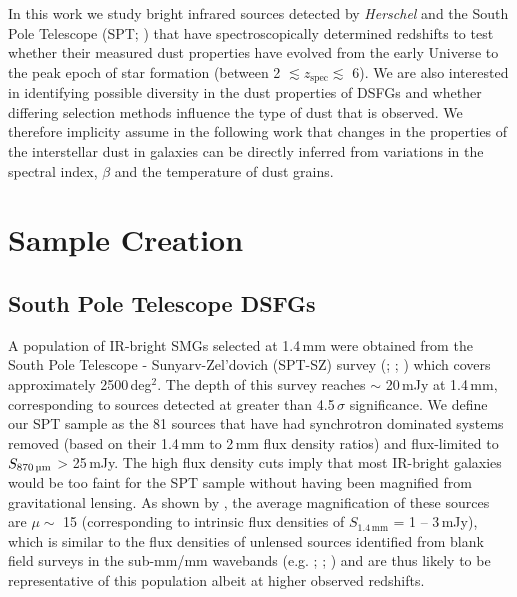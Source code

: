 In this work we study bright infrared sources detected by \textit{Herschel} and the South Pole Telescope (SPT; \citealt{Carlstrom_2011}) that have spectroscopically determined redshifts to test whether their measured dust properties have evolved from the early Universe to the peak epoch of star formation (between 2 $\lesssim z_{\textrm{spec}} \lesssim$ 6). We are also interested in identifying possible diversity in the dust properties of DSFGs and whether differing selection methods influence the type of dust that is observed. We therefore implicity assume in the following work that changes in the properties of the interstellar dust in galaxies can be directly inferred from variations in the spectral index, $\beta$ and the temperature of dust grains.

\section{Sample Creation}
\subsection{South Pole Telescope DSFGs}

A population of IR-bright SMGs selected at 1.4\,mm were obtained from the South Pole Telescope - Sunyarv-Zel'dovich (SPT-SZ) survey (\citealt{Vieira_2010}; \citealt{Mocanu_2013}; \citealt{Everett_2020}) which covers approximately 2500\,deg$^2$. The depth of this survey reaches $\sim$ 20\,mJy at 1.4\,mm, corresponding to sources detected at greater than 4.5\,$\sigma$ significance. We define our SPT sample as the 81 sources that have had synchrotron dominated systems removed (based on their 1.4\,mm to 2\,mm flux density ratios) and flux-limited to $S_{\textrm{870\,\micron}}$ > 25\,mJy. The high flux density cuts imply that most IR-bright galaxies would be too faint for the SPT sample without having been magnified from gravitational lensing. As shown by \citealt{Weiss_2013}, the average magnification of these sources are $\mu \sim$ 15 (corresponding to intrinsic flux densities of $S_{1.4\,\textrm{mm}}$ = 1 -- 3\,mJy), which is similar to the flux densities of unlensed sources identified from blank field surveys in the sub-mm/mm wavebands (e.g. \citealt{Coppin_2006}; \citealt{Pope_2006}; \citealt{Weiss_2009}) and are thus likely to be representative of this population albeit at higher observed redshifts.

